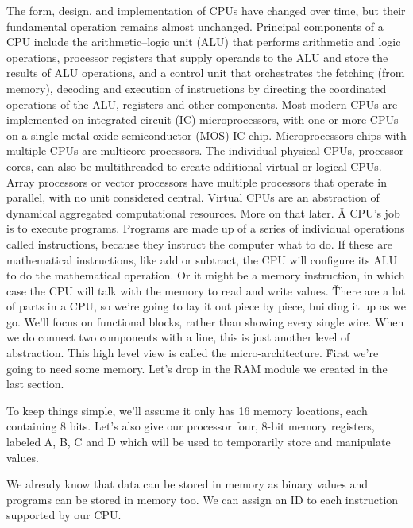 
The form, design, and implementation of CPUs have changed over time, but their fundamental operation remains almost
unchanged. Principal components of a CPU include the arithmetic–logic unit (ALU) that performs arithmetic and logic
operations, processor registers that supply operands to the ALU and store the results of ALU operations, and a
control unit that orchestrates the fetching (from memory), decoding and execution of instructions by directing the
coordinated operations of the ALU, registers and other components. \v

Most modern CPUs are implemented on integrated circuit (IC) microprocessors, with one or more CPUs on a single
metal-oxide-semiconductor (MOS) IC chip. Microprocessors chips with multiple CPUs are multicore processors. The
individual physical CPUs, processor cores, can also be multithreaded to create additional virtual or logical CPUs.
Array processors or vector processors have multiple processors that operate in parallel, with no unit considered
central. Virtual CPUs are an abstraction of dynamical aggregated computational resources. More on that later. \v

A CPU's job is to execute programs. Programs are made up of a series of individual operations called instructions,
because they instruct the computer what to do. If these are mathematical instructions, like add or subtract, the CPU
will configure its ALU to do the mathematical operation. Or it might be a memory instruction, in which case the CPU
will talk with the memory to read and write values. \v

There are a lot of parts in a CPU, so we're going to lay it out piece by piece, building it up as we go. We'll focus
on functional blocks, rather than showing every single wire. When we do connect two components with a line, this is
just another level of abstraction. This high level view is called the micro-architecture. \v

First we're going to need some memory. Let's drop in the RAM module we created in the last section.

\be
To keep things simple, we'll assume it only has 16 memory locations, each containing 8 bits. Let's also give our
processor four, 8-bit memory registers, labeled A, B, C and D which will be used to temporarily store and manipulate
values.

\ee

We already know that data can be stored in memory as binary values and programs can be stored in memory too. We can
assign an ID to each instruction supported by our CPU\@.

